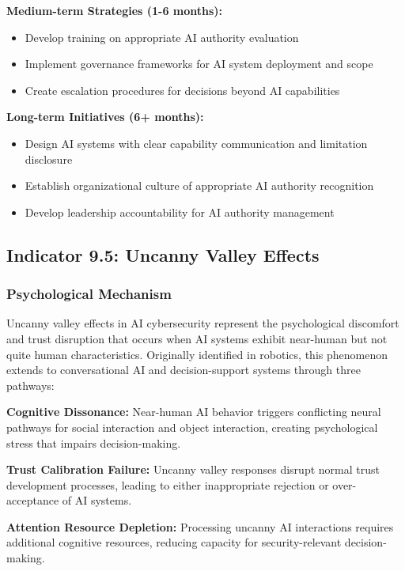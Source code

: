\documentclass[11pt,a4paper]{article}
\begin{document}
\textbf{Medium-term Strategies (1-6 months):}
\begin{itemize}
\item Develop training on appropriate AI authority evaluation
\item Implement governance frameworks for AI system deployment and scope
\item Create escalation procedures for decisions beyond AI capabilities
\end{itemize}

\textbf{Long-term Initiatives (6+ months):}
\begin{itemize}
\item Design AI systems with clear capability communication and limitation disclosure
\item Establish organizational culture of appropriate AI authority recognition
\item Develop leadership accountability for AI authority management
\end{itemize}

\subsection{Indicator 9.5: Uncanny Valley Effects}

\subsubsection{Psychological Mechanism}

Uncanny valley effects in AI cybersecurity represent the psychological discomfort and trust disruption that occurs when AI systems exhibit near-human but not quite human characteristics. Originally identified in robotics\cite{mori1970}, this phenomenon extends to conversational AI and decision-support systems through three pathways:

\textbf{Cognitive Dissonance:} Near-human AI behavior triggers conflicting neural pathways for social interaction and object interaction, creating psychological stress that impairs decision-making\cite{gray2007}.

\textbf{Trust Calibration Failure:} Uncanny valley responses disrupt normal trust development processes, leading to either inappropriate rejection or over-acceptance of AI systems\cite{mathur2016}.

\textbf{Attention Resource Depletion:} Processing uncanny AI interactions requires additional cognitive resources, reducing capacity for security-relevant decision-making\cite{cognitive2023}.
\end{document}
